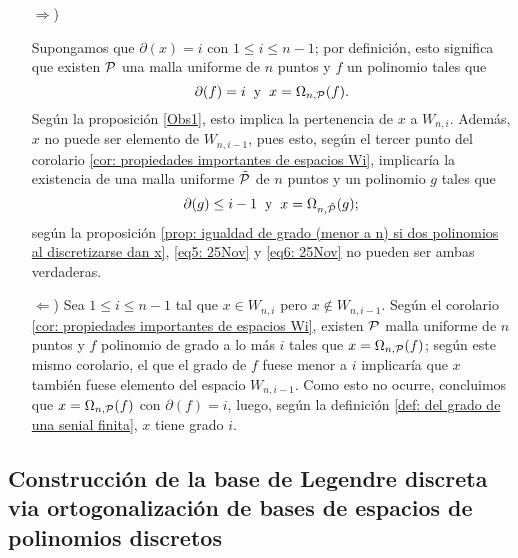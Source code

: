 \begin{itemize}
\item [$\Rightarrow$)]

Supongamos que $\partial(x)=i$ con $1 \leq i \leq n-1$;
por definición, esto significa que existen
$\mathcal{P}$ una malla uniforme de $n$ puntos y $f$ un 
polinomio 
tales que 
\begin{equation}
\label{eq5: 25Nov}
\partial(f)=i \hspace{0.2cm} \text{y} \hspace{0.2cm}
x=\Omega_{n,\mathcal{P}}(f).
\end{equation}
Según la proposición 
\ref{Obs1},
esto implica la pertenencia de $x$ a $W_{n,i}$.
Además, $x$ no puede ser elemento de $W_{n,i-1}$,
pues esto,
según el tercer punto del corolario
\ref{cor: propiedades importantes de espacios Wi},
implicaría la existencia de una
malla uniforme $\tilde{\mathcal{P}}$ de $n$
puntos y un polinomio $g$ tales que
\begin{equation}
\label{eq6: 25Nov}
\partial(g)\leq i-1 \hspace{0.2cm} \text{y} \hspace{0.2cm}
x=\Omega_{n,\tilde{\mathcal{P}}}(g);
\end{equation}
según la proposición
\ref{prop: igualdad de grado (menor a n) si dos polinomios al discretizarse dan x}, \eqref{eq5: 25Nov}
y \eqref{eq6: 25Nov} no pueden ser ambas verdaderas.

\item[$\Leftarrow$)] Sea
$1 \leq i \leq n-1$ tal que $x \in W_{n,i}$
pero $x \not\in W_{n,i-1}$.
Según el corolario
\ref{cor: propiedades importantes de espacios Wi}, existen
$\mathcal{P}$ malla uniforme de $n$ puntos y
$f$ polinomio de grado a lo más $i$ tales que
$x= \Omega_{n, \mathcal{P}}(f)$; según este mismo
corolario, el que el grado de $f$ fuese menor a $i$
implicaría que $x$ también fuese elemento
del espacio $W_{n,i-1}$. Como esto no ocurre, concluimos
que $x= \Omega_{n, \mathcal{P}}(f)$
con $\partial(f)=i$, luego, según la definición
\ref{def: del grado de una senial finita}, 
$x$ tiene grado $i$.
\end{itemize}
\QEDB
\vspace{0.2cm}




\subsection{Construcción de la base de Legendre discreta via ortogonalización de bases de espacios de polinomios discretos}

